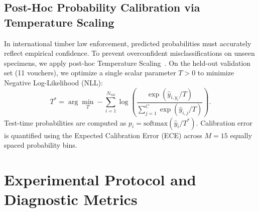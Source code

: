 \documentclass[a4paper,fleqn]{cas-sc}
\begin{document}
\subsection{Post-Hoc Probability Calibration via Temperature Scaling}
In international timber law enforcement, predicted probabilities must accurately reflect empirical confidence. To prevent overconfident misclassifications on unseen specimens, we apply post-hoc Temperature Scaling~\cite{guo2017calibration}. On the held-out validation set (11 vouchers), we optimize a single scalar parameter $T > 0$ to minimize Negative Log-Likelihood (NLL):
\begin{equation}
    T^* = \arg\min_T -\sum_{i=1}^{N_{\text{val}}} \log \left( \frac{\exp(\hat{y}_{i, y_i} / T)}{\sum_{j=1}^C \exp(\hat{y}_{i, j} / T)} \right).
\end{equation}
Test-time probabilities are computed as $p_i = \text{softmax}(\hat{y}_i / T^*)$. Calibration error is quantified using the Expected Calibration Error (ECE) across $M=15$ equally spaced probability bins.

\section{Experimental Protocol and Diagnostic Metrics}
\label{sec:protocol}
\end{document}
